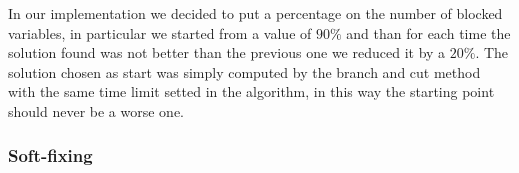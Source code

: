 In our implementation we decided to put a percentage on the number of blocked variables, in particular we started from a value of $90\%$ and than for each time the solution found was not better than the previous one we reduced it by a $20\%$. The solution chosen as start was simply computed by the branch and cut method with the same time limit setted in the algorithm, in this way the starting point should never be a worse one.


\subsubsection{Soft-fixing}
